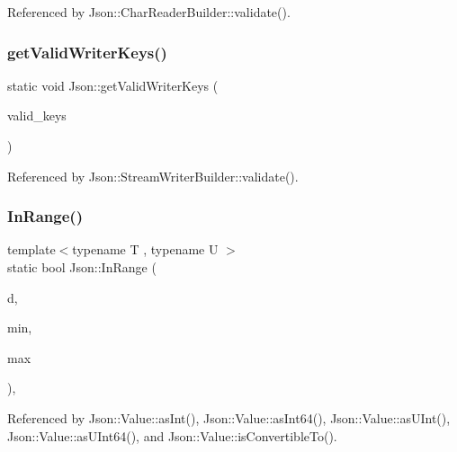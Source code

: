 Referenced by Json\+::\+Char\+Reader\+Builder\+::validate().

\mbox{\label{namespaceJson_a77ffcc6bb405332d84c260d304d4384e_a77ffcc6bb405332d84c260d304d4384e}} 
\subsubsection{\texorpdfstring{get\+Valid\+Writer\+Keys()}{getValidWriterKeys()}}
{\footnotesize\ttfamily static void Json\+::get\+Valid\+Writer\+Keys (\begin{DoxyParamCaption}\item[{std\+::set$<$ \hyperlink{json_8h_a1e723f95759de062585bc4a8fd3fa4be_a1e723f95759de062585bc4a8fd3fa4be}{J\+S\+O\+N\+C\+P\+P\+\_\+\+S\+T\+R\+I\+NG} $>$ $\ast$}]{valid\+\_\+keys }\end{DoxyParamCaption})\hspace{0.3cm}{\ttfamily [static]}}



Referenced by Json\+::\+Stream\+Writer\+Builder\+::validate().

\mbox{\label{namespaceJson_aff0180507262a244de61b961178d7443_aff0180507262a244de61b961178d7443}} 
\subsubsection{\texorpdfstring{In\+Range()}{InRange()}}
{\footnotesize\ttfamily template$<$typename T , typename U $>$ \\
static bool Json\+::\+In\+Range (\begin{DoxyParamCaption}\item[{double}]{d,  }\item[{T}]{min,  }\item[{U}]{max }\end{DoxyParamCaption})\hspace{0.3cm}{\ttfamily [inline]}, {\ttfamily [static]}}



Referenced by Json\+::\+Value\+::as\+Int(), Json\+::\+Value\+::as\+Int64(), Json\+::\+Value\+::as\+U\+Int(), Json\+::\+Value\+::as\+U\+Int64(), and Json\+::\+Value\+::is\+Convertible\+To().

